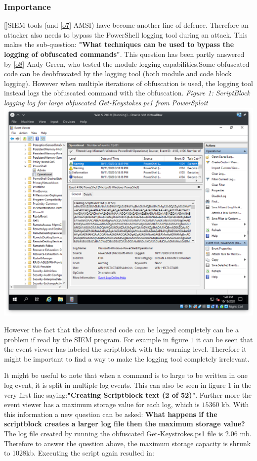 \documentclass{article}%
\begin{document}
\subsubsection{Importance}
[\hyperlink{14}]SIEM tools (and [\hyperlink{o7}{o7}] AMSI) have become another line of defence. Therefore an attacker also needs to bypass the PowerShell logging tool during an attack. This makes the sub-question: \textbf{"What techniques can be used to bypass the logging of obfuscated commands"}. This question has been partly answered by [\hyperlink{o8}{o8}] Andy Green, who tested the module logging capabilities.Some obfuscated code can be deobfuscated by the logging tool (both module and code block logging). However when multiple iterations of obfuscation is used, the logging tool instead logs the obfuscated command with the obfuscation.
\newline\newline
\hypertarget{fig1}{
	\textit{Figure 1: ScriptBlock logging log for large obfuscated Get-Keystokes.ps1 from PowerSploit}\\
	\includegraphics[scale=0.44]{1.png}
}

However the fact that the obfuscated code can be logged completely can be a problem if read by the SIEM program. For example in figure $1$ it can be seen that the event viewer has labeled the scriptblock with the warning level. Therefore it might be important to find a way to make the logging tool completely irrelevant.

It might be useful to note that when a command is to large to be written in one log event, it is split in multiple log events. This can also be seen in figure $1$ in the very first line saying:\textbf{"Creating Scriptblock text (2 of 52)"}. Further more the event viewer has a maximum storage value for each log, which is $15360$ kb. With this information a new question can be asked: \textbf{What happens if the scriptblock creates a larger log file then the maximum storage value?} The log file created by running the obfuscated Get-Keystrokes.ps1 file is $2.06$ mb. Therefore to answer the question above, the maximum storage capacity is shrunk to 1028kb. Executing the script again resulted in:\newline\newline
\end{document}

